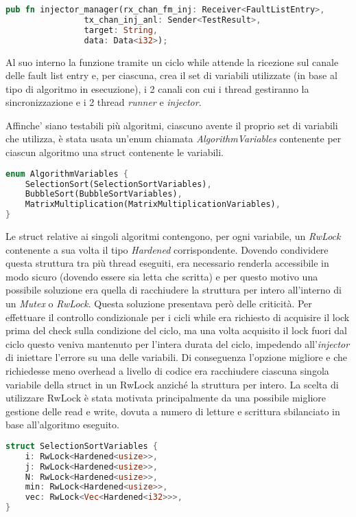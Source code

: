 \begin{lstlisting}[language=Rust, style=boxed]
pub fn injector_manager(rx_chan_fm_inj: Receiver<FaultListEntry>,
                tx_chan_inj_anl: Sender<TestResult>,
                target: String,
                data: Data<i32>);
\end{lstlisting}

Al suo interno la funzione tramite un ciclo while attende la ricezione sul canale delle fault list entry e, per ciascuna, crea il set di variabili utilizzate (in base al tipo di algoritmo in esecuzione), i 2 canali con cui i thread gestiranno la sincronizzazione e i 2 thread \textit{runner} e \textit{injector}.

Affinche' siano testabili più algoritmi, ciascuno avente il proprio set di variabili che utilizza, è stata usata un'enum chiamata \textit{AlgorithmVariables} contenente per ciascun algoritmo una struct contenente le variabili.

\begin{lstlisting}[language=Rust, style=boxed]
enum AlgorithmVariables {
    SelectionSort(SelectionSortVariables),
    BubbleSort(BubbleSortVariables),
    MatrixMultiplication(MatrixMultiplicationVariables),
}
\end{lstlisting}

Le struct relative ai singoli algoritmi contengono, per ogni variabile, un \textit{RwLock} contenente a sua volta il tipo \textit{Hardened} corrispondente. Dovendo condividere questa struttura tra più thread eseguiti, era necessario renderla accessibile in modo sicuro (dovendo essere sia letta che scritta) e per questo motivo una possibile soluzione era quella di racchiudere la struttura per intero all'interno di un \textit{Mutex} o \textit{RwLock}. Questa soluzione presentava però delle criticità. Per effettuare il controllo condizionale per i cicli while era richiesto di acquisire il lock prima del check sulla condizione del ciclo, ma una volta acquisito il lock fuori dal ciclo questo veniva mantenuto per l'intera durata del ciclo, impedendo all'\textit{injector} di iniettare l'errore su una delle variabili. Di conseguenza l'opzione migliore e che richiedesse meno overhead a livello di codice era racchiudere ciascuna singola variabile della struct in un RwLock anziché la struttura per intero. La scelta di utilizzare RwLock è stata motivata principalmente da una possibile migliore gestione delle read e write, dovuta a numero di letture e scrittura sbilanciato in base all'algoritmo eseguito.

\begin{lstlisting}[language=Rust, style=boxed]
struct SelectionSortVariables {
    i: RwLock<Hardened<usize>>,
    j: RwLock<Hardened<usize>>,
    N: RwLock<Hardened<usize>>,
    min: RwLock<Hardened<usize>>,
    vec: RwLock<Vec<Hardened<i32>>>,
}
\end{lstlisting}

